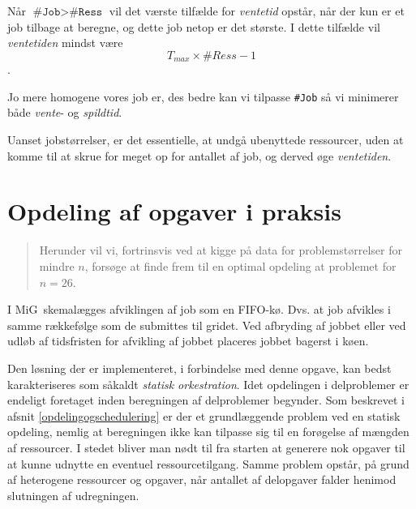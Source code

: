 \documentclass[draft,a4paper,11pt]{article}
\newcommand{\mig}{MiG}
\begin{document}
Når $\texttt{\#Job} > \texttt{\#Ress}$ vil det værste tilfælde for \emph{ventetid} opstår, når der kun er et job tilbage at beregne, og dette job netop er det største. I dette tilfælde vil \emph{ventetiden} mindst være 
\[
T_{max} \times \#Ress -1
\]
.



Jo mere homogene vores job er, des bedre kan vi tilpasse \texttt{\#Job} så vi minimerer både \emph{vente}- og \emph{spildtid}. 

Uanset jobstørrelser, er det essentielle, at undgå ubenyttede ressourcer, uden at komme til at skrue for meget op for antallet af job, og derved øge \emph{ventetiden}.




\section{Opdeling af opgaver i praksis}\label{opdelingipraksis}
\begin{verse}
	Herunder vil vi, fortrinsvis ved at kigge på data for problemstørrelser for mindre $n$, forsøge at finde frem til en optimal opdeling at problemet for $n=26$.
\end{verse}

I \mig\ skemalægges afviklingen af job som en FIFO-kø. Dvs. at job afvikles i samme rækkefølge som de submittes til gridet. Ved afbryding af jobbet eller ved udløb af tidsfristen for afvikling af jobbet placeres jobbet bagerst i køen. 

Den løsning der er implementeret, i forbindelse med denne opgave, kan bedst karakteriseres som såkaldt \emph{statisk orkestration}. Idet opdelingen i delproblemer er endeligt foretaget inden beregningen af delproblemer begynder. Som beskrevet i afsnit \ref{opdelingogschedulering} er der et grundlæggende problem ved en statisk opdeling, nemlig at beregningen ikke kan tilpasse sig til en forøgelse af mængden af ressourcer. I stedet bliver man nødt til fra starten at generere nok opgaver til at kunne udnytte en eventuel ressourcetilgang. Samme problem opstår, på grund af heterogene ressourcer og opgaver, når antallet af delopgaver falder henimod slutningen af udregningen. 
\end{document}

